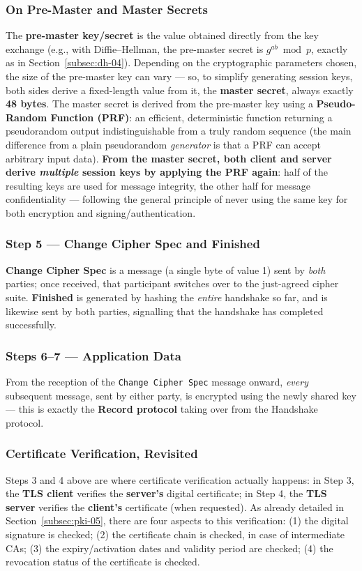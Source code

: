 \documentclass[12pt, a4paper]{article}
\begin{document}
\subsubsection*{On Pre-Master and Master Secrets}
The \textbf{pre-master key/secret} is the value obtained directly from the key exchange (e.g., with Diffie--Hellman, the pre-master secret is $g^{ab} \bmod p$, exactly as in Section~\ref{subsec:dh-04}). Depending on the cryptographic parameters chosen, the size of the pre-master key can vary --- so, to simplify generating session keys, both sides derive a fixed-length value from it, the \textbf{master secret}, always exactly \textbf{48 bytes}. The master secret is derived from the pre-master key using a \textbf{Pseudo-Random Function (PRF)}: an efficient, deterministic function returning a pseudorandom output indistinguishable from a truly random sequence (the main difference from a plain pseudorandom \emph{generator} is that a PRF can accept arbitrary input data). \textcolor{red!70!black}{\textbf{From the master secret, both client and server derive \emph{multiple} session keys by applying the PRF again}: half of the resulting keys are used for message integrity, the other half for message confidentiality --- following the general principle of never using the same key for both encryption and signing/authentication.}

\subsubsection*{Step 5 --- Change Cipher Spec and Finished}
\textbf{Change Cipher Spec} is a message (a single byte of value 1) sent by \emph{both} parties; once received, that participant switches over to the just-agreed cipher suite. \textbf{Finished} is generated by hashing the \emph{entire} handshake so far, and is likewise sent by both parties, signalling that the handshake has completed successfully.

\subsubsection*{Steps 6--7 --- Application Data}
From the reception of the \texttt{Change Cipher Spec} message onward, \emph{every} subsequent message, sent by either party, is encrypted using the newly shared key --- this is exactly the \textbf{Record protocol} taking over from the Handshake protocol.

\subsubsection{Certificate Verification, Revisited}
Steps 3 and 4 above are where certificate verification actually happens: in Step 3, the \textbf{TLS client} verifies the \textbf{server's} digital certificate; in Step 4, the \textbf{TLS server} verifies the \textbf{client's} certificate (when requested). As already detailed in Section~\ref{subsec:pki-05}, there are four aspects to this verification: (1) the digital signature is checked; (2) the certificate chain is checked, in case of intermediate CAs; (3) the expiry/activation dates and validity period are checked; (4) the revocation status of the certificate is checked.
\end{document}
